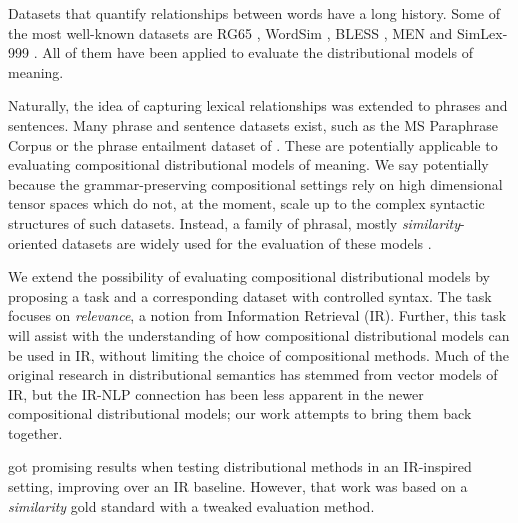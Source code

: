 Datasets that quantify relationships between words have a long history.\footnotemark{} Some of the most well-known datasets are RG65 \cite{Rubenstein:1965:CCS:365628.365657}, WordSim \cite{2002:PSC:503104.503110}, BLESS \cite{baroni-lenci:2011:GEMS}, MEN \cite{Bruni:2014:MDS:2655713.2655714} and SimLex-999 \cite{hill2014simlex}. All of them have been applied to evaluate the distributional models of meaning.


Naturally, the idea of capturing lexical relationships was extended to phrases and sentences. Many phrase and sentence datasets exist, such as the MS Paraphrase Corpus \cite{dolan2005par} or the phrase entailment dataset of . These are potentially applicable to evaluating compositional distributional models of meaning. We say potentially because the grammar-preserving compositional settings \cite{baroni2014frege,DBLP:journals/corr/abs-1003-4394}  rely on high dimensional tensor spaces which do not, at the moment, scale up to  the complex syntactic structures of such datasets. Instead, a family of phrasal, mostly \emph{similarity}-oriented datasets \cite{mitchell-lapata:2008:ACLMain,Grefenstette:2011:ESC:2145432.2145580,kartsaklis-sadrzadeh:2013:EMNLP,kartsadrqpl2014} are widely used for the evaluation of these models \cite{milajevs-EtAl:2014:EMNLP2014,kim-demarneffe-foslerlussier:2015:VSM-NLP}.

We extend the possibility of evaluating compositional distributional models by proposing a task and a corresponding dataset  with controlled syntax. The task focuses on \emph{relevance}, a notion from Information Retrieval (IR).  Further, this task will assist with the understanding of how compositional distributional  models  can be used in IR, without limiting the choice of compositional methods. Much of the original research in distributional semantics has stemmed from vector models of IR, but the IR-NLP connection has been less apparent in  the newer compositional distributional models; our work attempts to bring them back together.

 got promising results when testing distributional methods in an IR-inspired setting, improving over an IR baseline. However, that work was based on a \emph{similarity} gold standard with a tweaked evaluation method.

